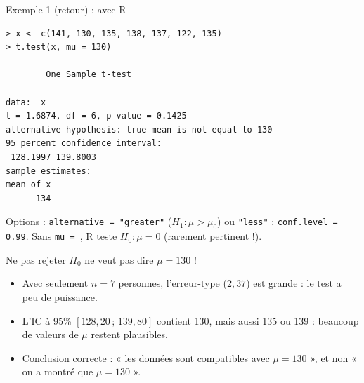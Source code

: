 \documentclass{BeamerTemplate}
\begin{document}
\begin{frame}[fragile,t]{Exemple 1 (retour) : avec R}
  \footnotesize
\begin{verbatim}
> x <- c(141, 130, 135, 138, 137, 122, 135)
> t.test(x, mu = 130)

        One Sample t-test

data:  x
t = 1.6874, df = 6, p-value = 0.1425
alternative hypothesis: true mean is not equal to 130
95 percent confidence interval:
 128.1997 139.8003
sample estimates:
mean of x
      134
\end{verbatim}

  \small
  Options : \texttt{alternative = "greater"} ($H_1 : \mu > \mu_0$) ou \texttt{"less"} ; \texttt{conf.level = 0.99}.
  Sans \texttt{mu = }, R teste $H_0 : \mu = 0$ (rarement pertinent !).
\end{frame}

\begin{frame}[t]{Ne pas rejeter $H_0$ ne veut pas dire $\mu = 130$ !}
  \begin{itemize}\itemsep 4mm
    \item Avec seulement $n = 7$ personnes, l'erreur-type ($2{,}37$) est grande : le test a \alert{peu de puissance}.
    \item<2-> L'IC à 95\% $[128{,}20 \,;\, 139{,}80]$ contient 130, mais aussi 135 ou 139 : beaucoup de valeurs de $\mu$ restent \alert{plausibles}.
    \item<3-> Conclusion correcte : « les données sont \alert{compatibles} avec $\mu = 130$ », et non « on a montré que $\mu = 130$ ».
  \end{itemize}

  \bigskip
\end{frame}
\end{document}
